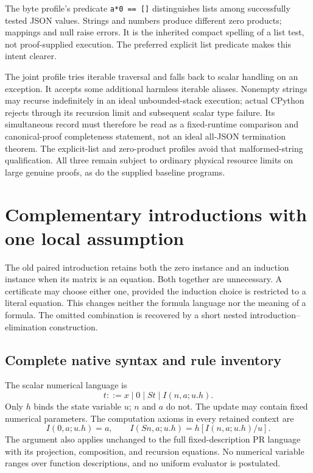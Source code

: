 \documentclass[11pt,letterpaper]{article}
\theoremstyle{definition}\newtheorem{definition}[theorem]{Definition}
\theoremstyle{remark}\newtheorem{remark}[theorem]{Remark}
\begin{document}
The byte profile's predicate \texttt{a*0 == []} distinguishes lists
among successfully tested JSON values. Strings and numbers produce
different zero products; mappings and null raise errors. It is the
inherited compact spelling of a list test, not proof-supplied execution.
The preferred explicit list predicate makes this intent clearer.

The joint profile tries iterable traversal and falls back to scalar
handling on an exception. It accepts some additional harmless iterable
aliases. Nonempty strings may recurse indefinitely in an ideal
unbounded-stack execution; actual CPython rejects through its recursion
limit and subsequent scalar type failure. Its simultaneous record must
therefore be read as a fixed-runtime comparison and canonical-proof
completeness statement, not an ideal all-JSON termination theorem.
The explicit-list and zero-product profiles avoid that malformed-string
qualification. All three remain subject to ordinary physical resource
limits on large genuine proofs, as do the supplied baseline programs.




\section{Complementary introductions with one local assumption}
\label{sec:choice-introduction}

The old paired introduction retains both the zero instance and an
induction instance when its matrix is an equation. Both together are
unnecessary. A certificate may choose either one, provided the induction
choice is restricted to a literal equation. This changes neither the
formula language nor the meaning of a formula. The omitted combination
is recovered by a short nested introduction--elimination construction.

\subsection{Complete native syntax and rule inventory}

The scalar numerical language is
\[
 t::=x\mid0\mid St\mid I(n,a;u.h).
\]
Only $h$ binds the state variable $u$; $n$ and $a$ do not.
The update may contain fixed numerical parameters. The computation
axioms in every retained context are
\[
 I(0,a;u.h)=a,\qquad
 I(Sn,a;u.h)=h[I(n,a;u.h)/u].
 \tag{I0, IS}\label{eq:choice-computations}
\]
The argument also applies unchanged to the full fixed-description PR
language with its projection, composition, and recursion equations.
No numerical variable ranges over function descriptions, and no uniform
evaluator is postulated.
\end{document}
